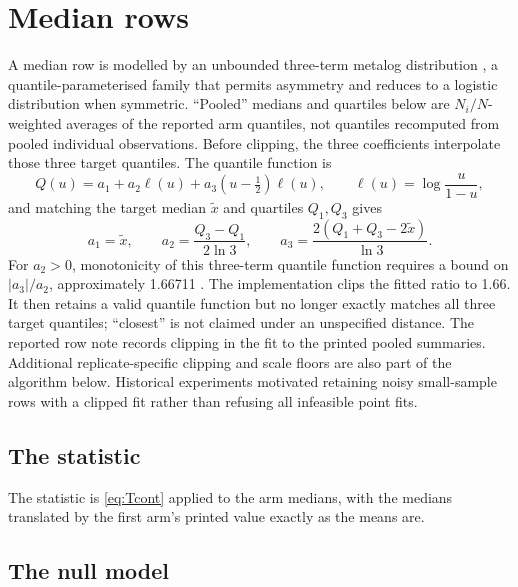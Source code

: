 \documentclass[11pt,a4paper]{article}
\begin{document}
\section{Median rows}
\label{sec:median}

A median row is modelled by an unbounded three-term metalog distribution \citep{keelin2016}, a quantile-parameterised family that permits asymmetry and reduces to a logistic distribution when symmetric. ``Pooled'' medians and quartiles below are $N_i/N$-weighted averages of the reported arm quantiles, not quantiles recomputed from pooled individual observations. Before clipping, the three coefficients interpolate those three target quantiles. The quantile function is
\begin{equation}
Q(u)=a_1+a_2\ell(u)+a_3(u-\tfrac12)\ell(u),\qquad \ell(u)=\log\frac{u}{1-u},
\end{equation}
and matching the target median $\tilde x$ and quartiles $Q_1,Q_3$ gives
\begin{equation}
a_1=\tilde x,\qquad a_2=\frac{Q_3-Q_1}{2\ln3},\qquad a_3=\frac{2(Q_1+Q_3-2\tilde x)}{\ln3}.
\end{equation}
For $a_2>0$, monotonicity of this three-term quantile function requires a bound on $|a_3|/a_2$, approximately 1.66711 \citep{keelin2016}. The implementation clips the fitted ratio to 1.66. It then retains a valid quantile function but no longer exactly matches all three target quantiles; ``closest'' is not claimed under an unspecified distance. The reported row note records clipping in the fit to the printed pooled summaries. Additional replicate-specific clipping and scale floors are also part of the algorithm below. Historical experiments motivated retaining noisy small-sample rows with a clipped fit rather than refusing all infeasible point fits.

\subsection{The statistic}

The statistic is \eqref{eq:Tcont} applied to the arm medians, with the medians translated by the first arm's printed value exactly as the means are.

\subsection{The null model}
\end{document}
